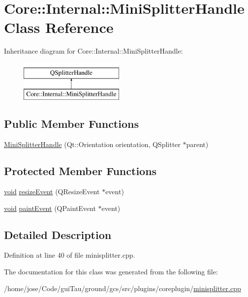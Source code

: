 \hypertarget{class_core_1_1_internal_1_1_mini_splitter_handle}{\section{Core\-:\-:Internal\-:\-:Mini\-Splitter\-Handle Class Reference}
\label{class_core_1_1_internal_1_1_mini_splitter_handle}
}
Inheritance diagram for Core\-:\-:Internal\-:\-:Mini\-Splitter\-Handle\-:\begin{figure}[H]
\begin{center}
\leavevmode
\includegraphics[height=2.000000cm]{class_core_1_1_internal_1_1_mini_splitter_handle}
\end{center}
\end{figure}
\subsection*{Public Member Functions}
\begin{DoxyCompactItemize}
\item 
\hyperlink{group___core_plugin_ga65f8058210c0d720960768f24228fed2}{Mini\-Splitter\-Handle} (Qt\-::\-Orientation orientation, Q\-Splitter $\ast$parent)
\end{DoxyCompactItemize}
\subsection*{Protected Member Functions}
\begin{DoxyCompactItemize}
\item 
\hyperlink{group___u_a_v_objects_plugin_ga444cf2ff3f0ecbe028adce838d373f5c}{void} \hyperlink{group___core_plugin_ga7ce2e2f7fcc5dcbe3911272c1075c895}{resize\-Event} (Q\-Resize\-Event $\ast$event)
\item 
\hyperlink{group___u_a_v_objects_plugin_ga444cf2ff3f0ecbe028adce838d373f5c}{void} \hyperlink{group___core_plugin_ga2e0a77b1add27985302bd6aedf2179a5}{paint\-Event} (Q\-Paint\-Event $\ast$event)
\end{DoxyCompactItemize}


\subsection{Detailed Description}


Definition at line 40 of file minisplitter.\-cpp.



The documentation for this class was generated from the following file\-:\begin{DoxyCompactItemize}
\item 
/home/jose/\-Code/gui\-Tau/ground/gcs/src/plugins/coreplugin/\hyperlink{minisplitter_8cpp}{minisplitter.\-cpp}\end{DoxyCompactItemize}
